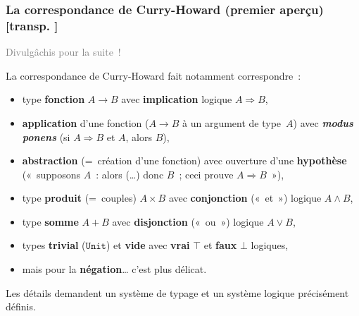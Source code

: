 \documentclass[mathserif,a4paper,aspectratio=169]{beamer}
\renewcommand{\frametitle}[1]{\subsubsection*{#1 {\footnotesize[transp. \insertframenumber]}}}
\begin{document}
%
\begin{frame}
\frametitle{La correspondance de Curry-Howard (premier aperçu)}

{\footnotesize\textcolor{gray}{Divulgâchis pour la suite !}\par}

\smallskip

La correspondance de Curry-Howard fait notamment correspondre :
\begin{itemize}
\item type \textbf{fonction} $A \to B$ avec \textbf{implication}
  logique $A \Rightarrow B$,
\item \textbf{application} d'une fonction ($A \to B$ à un argument de
  type $A$) avec \textbf{\textit{modus ponens}} (si $A \Rightarrow B$
  et $A$, alors $B$),
\item \textbf{abstraction} (= création d'une fonction) avec ouverture
  d'une \textbf{hypothèse} (« supposons $A$ : alors (…) donc $B$ ;
  ceci prouve $A \Rightarrow B$ »),
\item type \textbf{produit} (= couples) $A \times B$ avec
  \textbf{conjonction} (« et ») logique $A \land B$,
\item type \textbf{somme} $A + B$ avec \textbf{disjonction} (« ou »)
  logique $A \lor B$,
\item types \textbf{trivial} ($\texttt{Unit}$) et \textbf{vide} avec
  \textbf{vrai} $\top$ et \textbf{faux} $\bot$ logiques,
\item mais pour la \textbf{négation}…  c'est plus délicat.
\end{itemize}

\bigskip

{\footnotesize Les détails demandent un système de typage et un
  système logique précisément définis.\par}

\end{frame}
%
\end{document}
